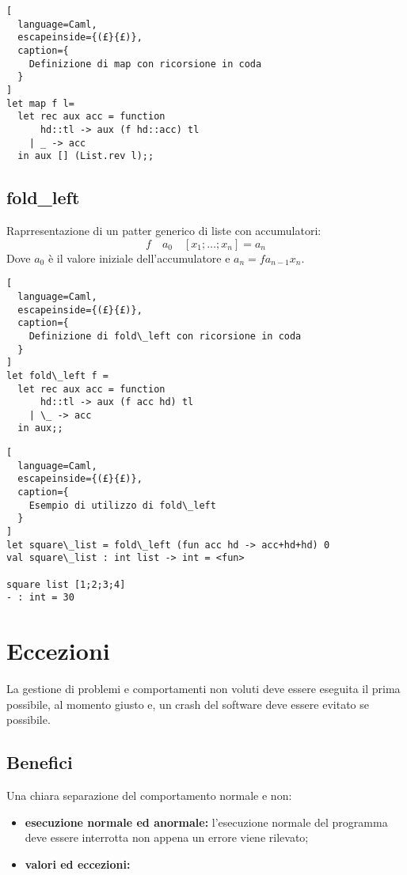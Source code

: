 \begin{lstlisting}[
  language=Caml,
  escapeinside={(£}{£)},
  caption={
    Definizione di map con ricorsione in coda
  }
]
let map f l=
  let rec aux acc = function
      hd::tl -> aux (f hd::acc) tl
    | _ -> acc
  in aux [] (List.rev l);;
\end{lstlisting}

\subsection{fold\_left}
Raprresentazione di un patter generico di liste con accumulatori:
\[
  f \quad a_0 \quad [x_1;\dots;x_n] = a_n
\]
Dove $a_0$ è il valore iniziale dell'accumulatore e $a_n=fa_{n-1}x_n$.

\begin{lstlisting}[
  language=Caml,
  escapeinside={(£}{£)},
  caption={
    Definizione di fold\_left con ricorsione in coda
  }
]
let fold\_left f =
  let rec aux acc = function
      hd::tl -> aux (f acc hd) tl
    | \_ -> acc
  in aux;;
\end{lstlisting}

\begin{lstlisting}[
  language=Caml,
  escapeinside={(£}{£)},
  caption={
    Esempio di utilizzo di fold\_left
  }
]
let square\_list = fold\_left (fun acc hd -> acc+hd+hd) 0
val square\_list : int list -> int = <fun>

square list [1;2;3;4]
- : int = 30
\end{lstlisting}

\section{Eccezioni}
La gestione di problemi e comportamenti non voluti deve essere eseguita il
prima possibile, al momento giusto e, un crash del software deve essere
evitato se possibile.

\subsection{Benefici}
Una chiara separazione del comportamento normale e non:
\begin{itemize}
  \item \textbf{esecuzione normale ed anormale:} l'esecuzione normale del
    programma deve essere interrotta non appena un errore viene rilevato;
  \item \textbf{valori ed eccezioni:}
\end{itemize}


